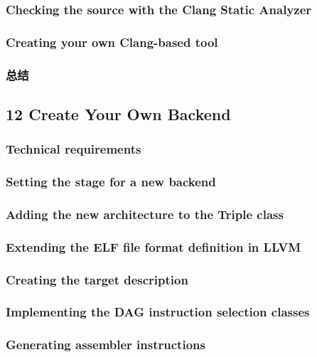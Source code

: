 \documentclass[11pt,a4paper,UTF8]{ctexart}
\begin{document}
		\subsubsection{Checking the source with the Clang Static Analyzer}
		\subsubsection{Creating your own Clang-based tool}
		\subsubsection{总结}
	\subsection{12 Create Your Own Backend}
		\subsubsection{Technical requirements}
		\subsubsection{Setting the stage for a new backend}
		\subsubsection{Adding the new architecture to the Triple class}
		\subsubsection{Extending the ELF file format definition in LLVM}
		\subsubsection{Creating the target description}
		\subsubsection{Implementing the DAG instruction selection classes}
		\subsubsection{Generating assembler instructions}
\end{document}
